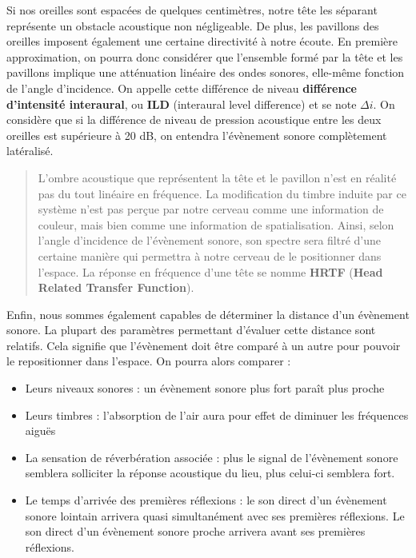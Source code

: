 \documentclass[
  letterpaper,
  DIV=11,
  numbers=noendperiod]{scrreprt}
\providecommand{\tightlist}{%
  \setlength{\itemsep}{0pt}\setlength{\parskip}{0pt}}\usepackage{longtable,booktabs,array}
\begin{document}
Si nos oreilles sont espacées de quelques centimètres, notre tête les
séparant représente un obstacle acoustique non négligeable. De plus, les
pavillons des oreilles imposent également une certaine directivité à
notre écoute. En première approximation, on pourra donc considérer que
l'ensemble formé par la tête et les pavillons implique une atténuation
linéaire des ondes sonores, elle-même fonction de l'angle d'incidence.
On appelle cette différence de niveau \textbf{différence d'intensité
interaural}, ou \textbf{ILD} (interaural level difference) et se note
\(\Delta i\). On considère que si la différence de niveau de pression
acoustique entre les deux oreilles est supérieure à 20 dB, on entendra
l'évènement sonore complètement latéralisé.

\begin{quote}
L'ombre acoustique que représentent la tête et le pavillon n'est en
réalité pas du tout linéaire en fréquence. La modification du timbre
induite par ce système n'est pas perçue par notre cerveau comme une
information de couleur, mais bien comme une information de
spatialisation. Ainsi, selon l'angle d'incidence de l'évènement sonore,
son spectre sera filtré d'une certaine manière qui permettra à notre
cerveau de le positionner dans l'espace. La réponse en fréquence d'une
tête se nomme \textbf{HRTF} (\textbf{Head Related Transfer Function}).
\end{quote}

Enfin, nous sommes également capables de déterminer la distance d'un
évènement sonore. La plupart des paramètres permettant d'évaluer cette
distance sont relatifs. Cela signifie que l'évènement doit être comparé
à un autre pour pouvoir le repositionner dans l'espace. On pourra alors
comparer :

\begin{itemize}
\tightlist
\item
  Leurs niveaux sonores : un évènement sonore plus fort paraît plus
  proche
\item
  Leurs timbres : l'absorption de l'air aura pour effet de diminuer les
  fréquences aiguës
\item
  La sensation de réverbération associée : plus le signal de l'évènement
  sonore semblera solliciter la réponse acoustique du lieu, plus
  celui-ci semblera fort.
\item
  Le temps d'arrivée des premières réflexions : le son direct d'un
  évènement sonore lointain arrivera quasi simultanément avec ses
  premières réflexions. Le son direct d'un évènement sonore proche
  arrivera avant ses premières réflexions.
\end{itemize}
\end{document}
